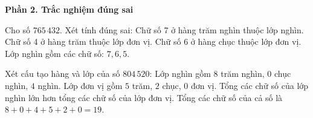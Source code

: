 \textbf{Phần 2. Trắc nghiệm đúng sai}

\begin{ex} %
Cho số $765\,432$. Xét tính đúng sai:
\choiceTF
{\True Chữ số 7 ở hàng trăm nghìn thuộc lớp nghìn.}
{\True Chữ số 4 ở hàng trăm thuộc lớp đơn vị.}
{Chữ số 6 ở hàng chục thuộc lớp đơn vị.}
{\True Lớp nghìn gồm các chữ số: $7, 6, 5$.}
\end{ex}

\begin{ex} %
Xét cấu tạo hàng và lớp của số $804\,520$:
\choiceTF
{\True Lớp nghìn gồm $8$ trăm nghìn, $0$ chục nghìn, $4$ nghìn.}
{\True Lớp đơn vị gồm $5$ trăm, $2$ chục, $0$ đơn vị.}
{Tổng các chữ số của lớp nghìn lớn hơn tổng các chữ số của lớp đơn vị.}
{\True Tổng các chữ số của cả số là $8 + 0 + 4 + 5 + 2 + 0 = 19$.}
\end{ex}

